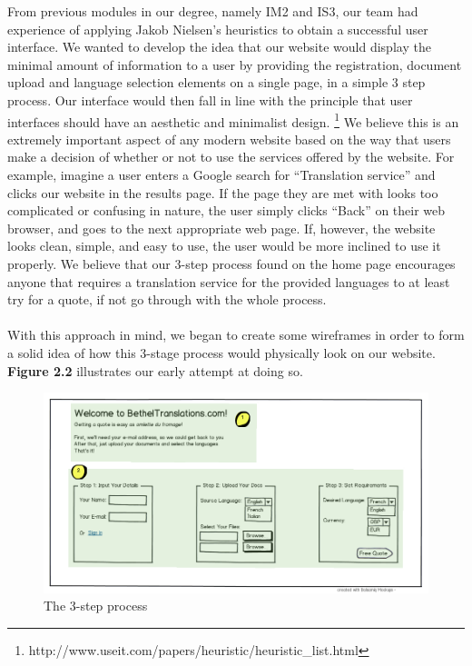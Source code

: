 \documentclass{l3proj}
\begin{document}
From previous modules in our degree, namely IM2 and IS3, our team had experience of applying Jakob Nielsen's heuristics to obtain a successful user interface. We wanted to develop the idea that our website would display the minimal amount of information to a user by providing the registration, document upload and language selection elements on a single page, in a simple 3 step process. Our interface would then fall in line with the principle that user interfaces should have an aesthetic and minimalist design. \footnote{http://www.useit.com/papers/heuristic/heuristic\_list.html} We believe this is an extremely important aspect of any modern website based on the way that users make a decision of whether or not to use the services offered by the website. For example, imagine a user enters a Google search for ``Translation service'' and clicks our website in the results page. If the page they are met with looks too complicated or confusing in nature, the user simply clicks ``Back'' on their web browser, and goes to the next appropriate web page. If, however, the website looks clean, simple, and easy to use, the user would be more inclined to use it properly. We believe that our 3-step process found on the home page encourages anyone that requires a translation service for the provided languages to at least try for a quote, if not go through with the whole process.\\
\\
With this approach in mind, we began to create some wireframes in order to form a solid idea of how this 3-stage process would physically look on our website. \textbf{Figure 2.2} illustrates our early attempt at doing so.

\begin{figure}
\begin{center}
\includegraphics[width=\linewidth]{wireframes/bt-3step}
\caption{The 3-step process}
\end{center}
\end{figure}
\end{document}
